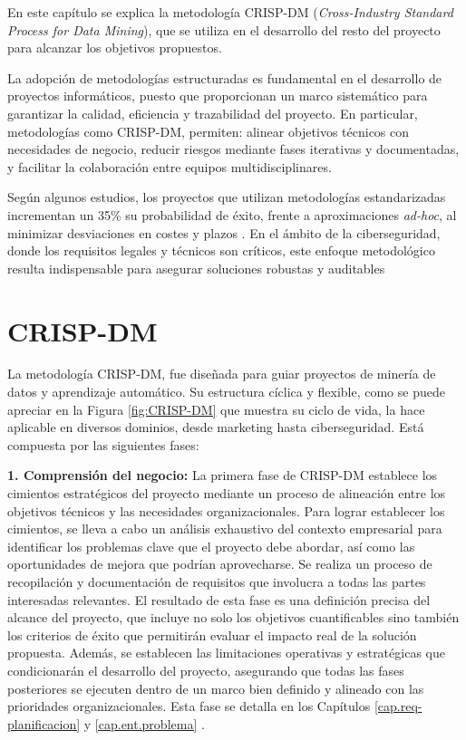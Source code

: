 
En este capítulo se explica la metodología CRISP-DM (\textit{Cross-Industry Standard Process for Data Mining}), que se utiliza en el desarrollo del resto del proyecto para alcanzar los objetivos propuestos.

La adopción de metodologías estructuradas es fundamental en el desarrollo de proyectos informáticos, puesto que proporcionan un marco sistemático para garantizar la calidad, eficiencia y trazabilidad del proyecto. En particular, metodologías como CRISP-DM, permiten: alinear objetivos técnicos con necesidades de negocio, reducir riesgos mediante fases iterativas y documentadas, y facilitar la colaboración entre equipos multidisciplinares.

Según algunos estudios, los proyectos que utilizan metodologías estandarizadas incrementan un 35\% su probabilidad de éxito, frente a aproximaciones \textit{ad-hoc}, al minimizar desviaciones en costes y plazos \cite{chapman2000crisp}. En el ámbito de la ciberseguridad, donde los requisitos legales y técnicos son críticos, este enfoque metodológico resulta indispensable para asegurar soluciones robustas y auditables

\section{CRISP-DM}
La metodología CRISP-DM, fue diseñada para guiar proyectos de minería de datos y aprendizaje automático. Su estructura cíclica y flexible, como se puede apreciar en la Figura \ref{fig:CRISP-DM} que muestra su ciclo de vida, la hace aplicable en diversos dominios, desde marketing hasta ciberseguridad. Está compuesta por las siguientes fases:

\textbf{1. Comprensión del negocio:} La primera fase de CRISP-DM establece los cimientos estratégicos del proyecto mediante un proceso de alineación entre los objetivos técnicos y las necesidades organizacionales. Para lograr establecer los cimientos, se lleva a cabo un análisis exhaustivo del contexto empresarial para identificar los problemas clave que el proyecto debe abordar, así como las oportunidades de mejora que podrían aprovecharse. Se realiza un proceso de recopilación y documentación de requisitos que involucra a todas las partes interesadas relevantes. El resultado de esta fase es una definición precisa del alcance del proyecto, que incluye no solo los objetivos cuantificables sino también los criterios de éxito que permitirán evaluar el impacto real de la solución propuesta. Además, se establecen las limitaciones operativas y estratégicas que condicionarán el desarrollo del proyecto, asegurando que todas las fases posteriores se ejecuten dentro de un marco bien definido y alineado con las prioridades organizacionales. Esta fase se detalla en los Capítulos \ref{cap.req-planificacion}  y \ref{cap.ent.problema} .


